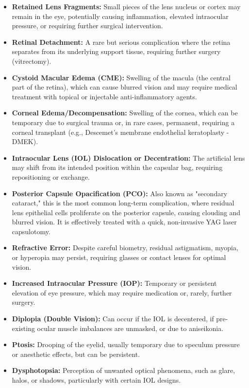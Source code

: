 \begin{itemize}
\begin{itemize}
      \item \textbf{Retained Lens Fragments:} Small pieces of the lens nucleus or cortex may remain in the eye, potentially causing inflammation, elevated intraocular pressure, or requiring further surgical intervention.
      \item \textbf{Retinal Detachment:} A rare but serious complication where the retina separates from its underlying support tissue, requiring further surgery (vitrectomy).
      \item \textbf{Cystoid Macular Edema (CME):} Swelling of the macula (the central part of the retina), which can cause blurred vision and may require medical treatment with topical or injectable anti-inflammatory agents.
      \item \textbf{Corneal Edema/Decompensation:} Swelling of the cornea, which can be temporary due to surgical trauma or, in rare cases, permanent, requiring a corneal transplant (e.g., Descemet's membrane endothelial keratoplasty - DMEK).
      \item \textbf{Intraocular Lens (IOL) Dislocation or Decentration:} The artificial lens may shift from its intended position within the capsular bag, requiring repositioning or exchange.
      \item \textbf{Posterior Capsule Opacification (PCO):} Also known as "secondary cataract," this is the most common long-term complication, where residual lens epithelial cells proliferate on the posterior capsule, causing clouding and blurred vision. It is effectively treated with a quick, non-invasive YAG laser capsulotomy.
      \item \textbf{Refractive Error:} Despite careful biometry, residual astigmatism, myopia, or hyperopia may persist, requiring glasses or contact lenses for optimal vision.
      \item \textbf{Increased Intraocular Pressure (IOP):} Temporary or persistent elevation of eye pressure, which may require medication or, rarely, further surgery.
      \item \textbf{Diplopia (Double Vision):} Can occur if the IOL is decentered, if pre-existing ocular muscle imbalances are unmasked, or due to aniseikonia.
      \item \textbf{Ptosis:} Drooping of the eyelid, usually temporary due to speculum pressure or anesthetic effects, but can be persistent.
      \item \textbf{Dysphotopsia:} Perception of unwanted optical phenomena, such as glare, halos, or shadows, particularly with certain IOL designs.
    \end{itemize}
\end{itemize}

